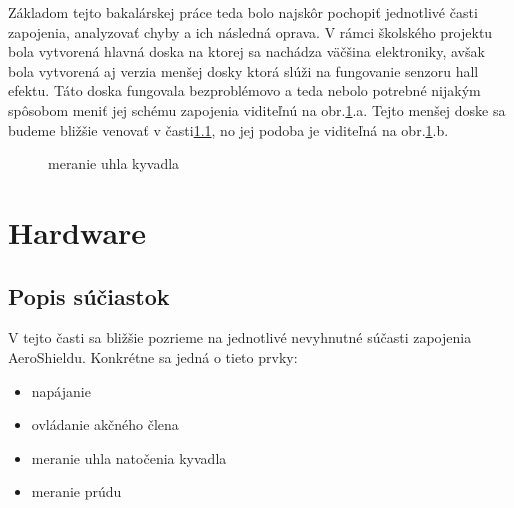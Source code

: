 Základom tejto bakalárskej práce teda bolo najskôr pochopiť jednotlivé časti zapojenia, analyzovať chyby a ich následná oprava. V rámci školského projektu bola vytvorená hlavná doska na ktorej sa nachádza väčšina elektroniky, avšak bola vytvorená aj verzia menšej dosky ktorá slúži na fungovanie senzoru hall efektu. Táto doska fungovala bezproblémovo a teda nebolo potrebné nijakým spôsobom meniť jej schému zapojenia viditeľnú na obr.\ref{OBRAZOK 2.1.2}.a. Tejto menšej doske sa budeme bližšie venovať v časti\ref{}, no jej podoba je viditeľná na obr.\ref{OBRAZOK 2.1.2}.b.


\begin{figure}[!tbh]
	\hfill
	\hfill
	\hfill
	\caption{meranie uhla kyvadla}\label{OBRAZOK 2.1.2}
\end{figure}

\vspace{3cm}


\section{Hardware}
\subsection{Popis súčiastok}

V tejto časti sa bližšie pozrieme na jednotlivé nevyhnutné súčasti zapojenia AeroShieldu. Konkrétne sa jedná o tieto prvky:
\begin{multicols}{2}
	\begin{itemize}
		\item napájanie
		\item ovládanie akčného člena
		\item meranie uhla natočenia kyvadla
		\item meranie prúdu
	\end{itemize}
\end{multicols}


